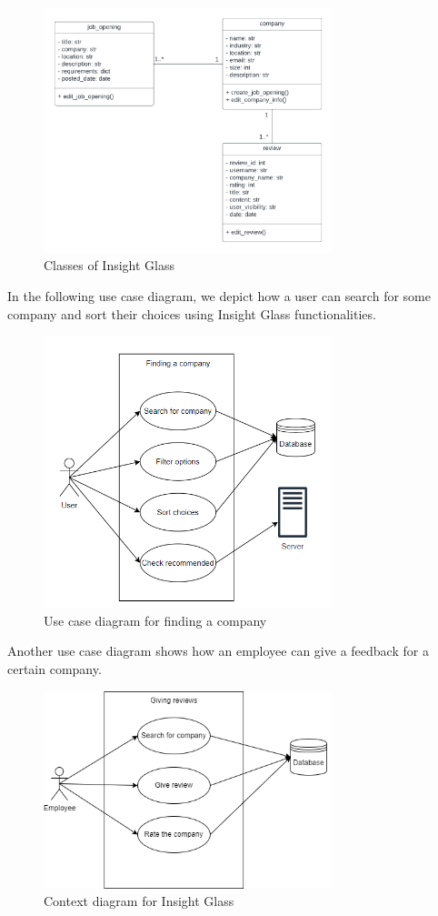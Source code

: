 \documentclass[titlepage]{article}
\begin{document}
\begin{figure}[H]
    \centering
    \includegraphics[width=0.75\textwidth]{Images/class_II.png}
    \caption{Classes of Insight Glass}
\end{figure}
\newpage
In the following use case diagram, we depict how a user can search for some company and sort their choices using Insight Glass functionalities.
\begin{figure}[H]
    \centering
    \includegraphics[width=0.75\textwidth]{Images/use_case.PNG}
    \caption{Use case diagram for finding a company}
\end{figure}
Another use case diagram shows how an employee can give a feedback for a certain company.
\begin{figure}[H]
    \centering
    \includegraphics[width=0.75\textwidth]{Images/Reviews.png}
    \caption{Context diagram for Insight Glass}
\end{figure}
\end{document}
